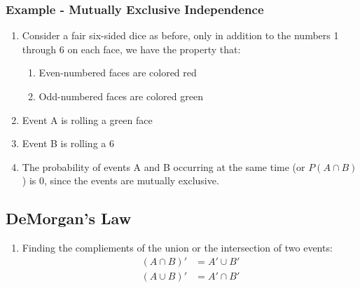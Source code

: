 \documentclass[../INDE315.tex]{subfiles}
\begin{document}
\subsubsection*{Example - Mutually Exclusive Independence}
\begin{enumerate}
    \item Consider a fair six-sided dice as before, only in addition to the numbers 1 through 6 on each face, we have the property that:
        \begin{enumerate}
            \item Even-numbered faces are colored red
            \item Odd-numbered faces are colored green
        \end{enumerate}
    \item Event A is rolling a green face
    \item Event B is rolling a 6
    \item The probability of events A and B occurring at the same time (or $P(A \cap B)$) is 0, since the events are mutually exclusive.
\end{enumerate}

\subsection*{DeMorgan's Law}
\begin{enumerate}
    \item Finding the compliements of the union or the intersection of two events:
        \begin{equation*}
            \begin{aligned}
                (A \cap B)' &= A' \cup B' \\
                (A \cup B)' &= A' \cap B' \\
            \end{aligned}
        \end{equation*}
\end{enumerate}
\end{document}
